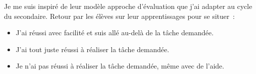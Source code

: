 Je me suis inspiré de leur modèle approche d'évaluation que j'ai adapter au cycle du secondaire.
Retour par les élèves sur leur apprentissages pour se situer~:
\begin{itemize}
\item J'ai réussi avec facilité et suis allé au-delà de la tâche demandée. 
\item J'ai tout juste réussi à réaliser la tâche demandée.
\item Je n'ai pas réussi à réaliser la tâche demandée, même avec de l'aide.
\end{itemize} 


